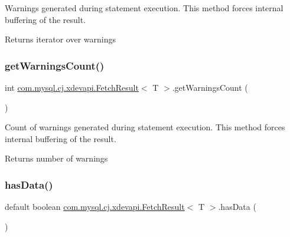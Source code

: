 Warnings generated during statement execution. This method forces internal buffering of the result.

\begin{DoxyReturn}{Returns}
iterator over warnings 
\end{DoxyReturn}
\mbox{\label{interfacecom_1_1mysql_1_1cj_1_1xdevapi_1_1_fetch_result_aa7381aaeb95c8fcc7ec6166ed02e2780}} 
\subsubsection{\texorpdfstring{get\+Warnings\+Count()}{getWarningsCount()}}
{\footnotesize\ttfamily int \mbox{\hyperlink{interfacecom_1_1mysql_1_1cj_1_1xdevapi_1_1_fetch_result}{com.\+mysql.\+cj.\+xdevapi.\+Fetch\+Result}}$<$ T $>$.get\+Warnings\+Count (\begin{DoxyParamCaption}{ }\end{DoxyParamCaption})}

Count of warnings generated during statement execution. This method forces internal buffering of the result.

\begin{DoxyReturn}{Returns}
number of warnings 
\end{DoxyReturn}
\mbox{\label{interfacecom_1_1mysql_1_1cj_1_1xdevapi_1_1_fetch_result_acb85a5473a550decd72e07fddf950358}} 
\subsubsection{\texorpdfstring{has\+Data()}{hasData()}}
{\footnotesize\ttfamily default boolean \mbox{\hyperlink{interfacecom_1_1mysql_1_1cj_1_1xdevapi_1_1_fetch_result}{com.\+mysql.\+cj.\+xdevapi.\+Fetch\+Result}}$<$ T $>$.has\+Data (\begin{DoxyParamCaption}{ }\end{DoxyParamCaption})}


